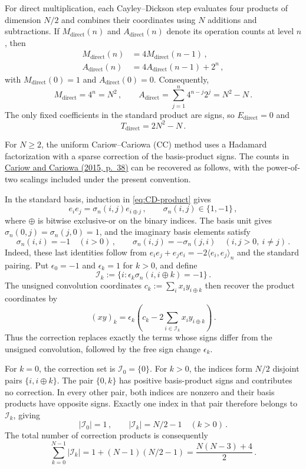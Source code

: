 \documentclass[11pt,reqno]{amsart}
\numberwithin{equation}{section}
\begin{document}
For direct multiplication, each Cayley--Dickson step evaluates four
products of dimension $N/2$ and combines their coordinates using $N$
additions and subtractions. If $M_{\mathrm{direct}}(n)$ and
$A_{\mathrm{direct}}(n)$ denote its operation counts at level $n$, then
\[
\begin{aligned}
M_{\mathrm{direct}}(n)&=4M_{\mathrm{direct}}(n-1)\,,\\
A_{\mathrm{direct}}(n)&=4A_{\mathrm{direct}}(n-1)+2^n\,,
\end{aligned}
\]
with $M_{\mathrm{direct}}(0)=1$ and $A_{\mathrm{direct}}(0)=0$.
Consequently,
\[
M_{\mathrm{direct}}=4^n=N^2\,,\qquad
A_{\mathrm{direct}}
=\sum_{j=1}^n4^{n-j}2^j=N^2-N\,.
\]
The only fixed coefficients in the standard product are signs, so
$E_{\mathrm{direct}}=0$ and
\[
T_{\mathrm{direct}}=2N^2-N\,.
\]

For $N\ge2$, the uniform Cariow--Cariowa (CC) method uses a Hadamard
factorization
with a sparse correction of the basis-product signs. The counts in
\href{https://doi.org/10.15199/48.2015.02.09}{Cariow and Cariowa
(2015, p.~38)} can be recovered as follows, with the power-of-two
scalings included under the present convention.

In the standard basis, induction in \eqref{eq:CD-product} gives
\[
e_i e_j=\sigma_n(i,j)e_{i\oplus j}\,,\qquad
\sigma_n(i,j)\in\{1,-1\}\,,
\]
where $\oplus$ is bitwise exclusive-or on the binary indices. The basis
unit gives $\sigma_n(0,j)=\sigma_n(j,0)=1$, and the imaginary basis
elements satisfy
\[
\sigma_n(i,i)=-1\quad(i>0)\,,\qquad
\sigma_n(i,j)=-\sigma_n(j,i)\quad(i,j>0,\ i\ne j)\,.
\]
Indeed, these last identities follow from
$e_i e_j+e_j e_i=-2\langle e_i,e_j\rangle_n$ and the standard pairing.
Put $\epsilon_0=-1$ and $\epsilon_k=1$ for $k>0$, and define
\[
\mathcal I_k:=
\{i:\epsilon_k\sigma_n(i,i\oplus k)=-1\}\,.
\]
The unsigned convolution coordinates
$c_k:=\sum_i x_i y_{i\oplus k}$ then recover the product coordinates by
\[
(xy)_k=\epsilon_k\left(c_k-
 2\sum_{i\in\mathcal I_k}x_i y_{i\oplus k}\right)\,.
\]
Thus the correction replaces exactly the terms whose signs differ from
the unsigned convolution, followed by the free sign change $\epsilon_k$.

For $k=0$, the correction set is $\mathcal I_0=\{0\}$. For $k>0$, the
indices form $N/2$ disjoint pairs $\{i,i\oplus k\}$. The pair
$\{0,k\}$ has positive basis-product signs and contributes no
correction. In every other pair, both indices are nonzero and their
basis products have opposite signs. Exactly one index in that pair
therefore belongs to $\mathcal I_k$, giving
\[
|\mathcal I_0|=1\,,\qquad
|\mathcal I_k|=N/2-1\quad(k>0)\,.
\]
The total number of correction products is consequently
\[
\sum_{k=0}^{N-1}|\mathcal I_k|
=1+(N-1)(N/2-1)=\frac{N(N-3)+4}{2}\,.
\]
\end{document}
